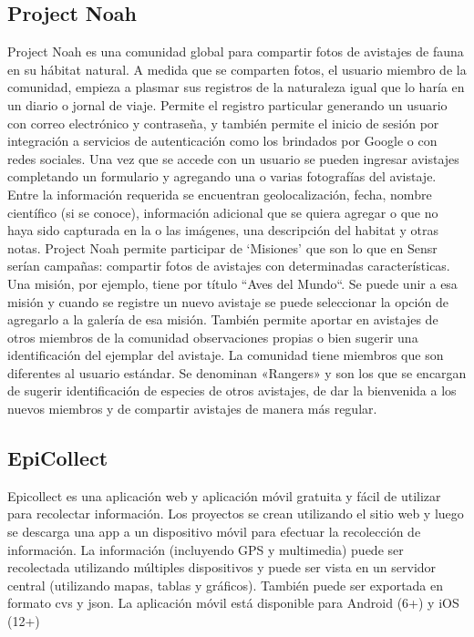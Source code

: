 \subsection{Project Noah}
Project Noah \cite{projectNoah} es una comunidad global para compartir fotos de avistajes de fauna en su hábitat natural. A medida que se comparten fotos, el usuario miembro de la comunidad, empieza a plasmar sus registros de la naturaleza igual que lo haría en un diario o jornal de viaje. 
Permite el registro particular generando un usuario con correo electrónico y contraseña, y también permite el inicio de sesión por integración a servicios de autenticación como los brindados por Google o con redes sociales.
Una vez que se accede con un usuario se pueden ingresar avistajes completando un formulario y agregando una o varias fotografías del avistaje. Entre la información requerida se encuentran geolocalización, fecha, nombre científico (si se conoce), información adicional que se quiera agregar o que no haya sido capturada en la o las imágenes, una descripción del habitat y otras notas. 
Project Noah permite participar de ‘Misiones’ que son lo que en Sensr serían campañas: compartir fotos de avistajes con determinadas características. Una misión, por ejemplo, tiene por título ``Aves del Mundo“. Se puede unir a esa misión y cuando se registre un nuevo avistaje se puede seleccionar la opción de agregarlo a la galería de esa misión. También permite aportar en avistajes de otros miembros de la comunidad observaciones propias o bien sugerir una identificación del ejemplar del avistaje.
La comunidad tiene miembros que son diferentes al usuario estándar. Se denominan «Rangers» y son los que se encargan de sugerir identificación de especies de otros avistajes, de dar la bienvenida a los nuevos miembros y de compartir avistajes de manera más regular. 

\subsection{EpiCollect}
Epicollect \cite{epicollect} es una aplicación web y aplicación móvil gratuita y fácil de utilizar para recolectar información. Los proyectos se crean utilizando el sitio web y luego se descarga una app a un dispositivo móvil para efectuar la recolección de información. 
La información (incluyendo GPS y multimedia) puede ser recolectada utilizando múltiples dispositivos y puede ser vista en un servidor central (utilizando mapas, tablas y gráficos).
También puede ser exportada en formato cvs y json.
La aplicación móvil está disponible para Android (6+) y iOS (12+)

